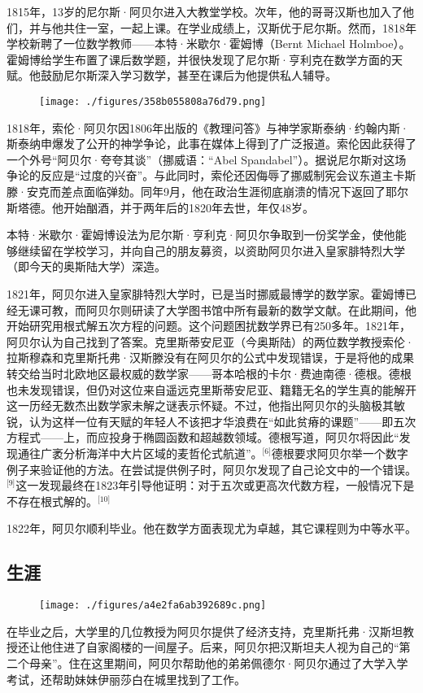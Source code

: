 1815年，13岁的尼尔斯·阿贝尔进入大教堂学校。次年，他的哥哥汉斯也加入了他们，并与他共住一室，一起上课。在学业成绩上，汉斯优于尼尔斯。然而，1818年学校新聘了一位数学教师——本特·米歇尔·霍姆博（Bernt Michael Holmboe）。霍姆博给学生布置了课后数学题，并很快发现了尼尔斯·亨利克在数学方面的天赋。他鼓励尼尔斯深入学习数学，甚至在课后为他提供私人辅导。
\begin{figure}[ht]
\centering
\texttt{[image: ./figures/358b055808a76d79.png]}
\caption{} \label{fig_NRSAB_1}
\end{figure}
1818年，索伦·阿贝尔因1806年出版的《教理问答》与神学家斯泰纳·约翰内斯·斯泰纳申爆发了公开的神学争论，此事在媒体上得到了广泛报道。索伦因此获得了一个外号“阿贝尔·夸夸其谈”（挪威语：“Abel Spandabel”）。据说尼尔斯对这场争论的反应是“过度的兴奋”。与此同时，索伦还因侮辱了挪威制宪会议东道主卡斯滕·安克而差点面临弹劾。同年9月，他在政治生涯彻底崩溃的情况下返回了耶尔斯塔德。他开始酗酒，并于两年后的1820年去世，年仅48岁。

本特·米歇尔·霍姆博设法为尼尔斯·亨利克·阿贝尔争取到一份奖学金，使他能够继续留在学校学习，并向自己的朋友募资，以资助阿贝尔进入皇家腓特烈大学（即今天的奥斯陆大学）深造。

1821年，阿贝尔进入皇家腓特烈大学时，已是当时挪威最博学的数学家。霍姆博已经无课可教，而阿贝尔则研读了大学图书馆中所有最新的数学文献。在此期间，他开始研究用根式解五次方程的问题。这个问题困扰数学界已有250多年。1821年，阿贝尔认为自己找到了答案。克里斯蒂安尼亚（今奥斯陆）的两位数学教授索伦·拉斯穆森和克里斯托弗·汉斯滕没有在阿贝尔的公式中发现错误，于是将他的成果转交给当时北欧地区最权威的数学家——哥本哈根的卡尔·费迪南德·德根。德根也未发现错误，但仍对这位来自遥远克里斯蒂安尼亚、籍籍无名的学生真的能解开这一历经无数杰出数学家未解之谜表示怀疑。不过，他指出阿贝尔的头脑极其敏锐，认为这样一位有天赋的年轻人不该把才华浪费在“如此贫瘠的课题”——即五次方程式——上，而应投身于椭圆函数和超越数领域。德根写道，阿贝尔将因此“发现通往广袤分析海洋中大片区域的麦哲伦式航道”。\(^\text{[6]}\)德根要求阿贝尔举一个数字例子来验证他的方法。在尝试提供例子时，阿贝尔发现了自己论文中的一个错误。\(^\text{[9]}\)这一发现最终在1823年引导他证明：对于五次或更高次代数方程，一般情况下是不存在根式解的。\(^\text{[10]}\)

1822年，阿贝尔顺利毕业。他在数学方面表现尤为卓越，其它课程则为中等水平。
\subsection{生涯}
\begin{figure}[ht]
\centering
\texttt{[image: ./figures/a4e2fa6ab392689c.png]}
\caption{} \label{fig_NRSAB_2}
\end{figure}
在毕业之后，大学里的几位教授为阿贝尔提供了经济支持，克里斯托弗·汉斯坦教授还让他住进了自家阁楼的一间屋子。后来，阿贝尔把汉斯坦夫人视为自己的“第二个母亲”。住在这里期间，阿贝尔帮助他的弟弟佩德尔·阿贝尔通过了大学入学考试，还帮助妹妹伊丽莎白在城里找到了工作。

